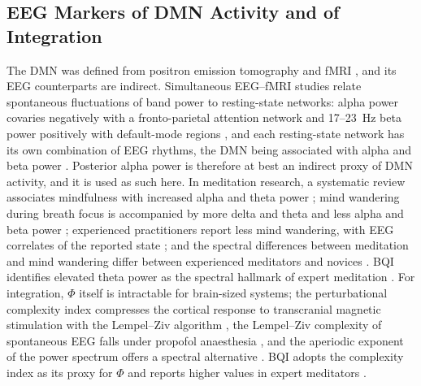 \subsection{EEG Markers of DMN Activity and of Integration}
The DMN was defined from positron emission tomography and fMRI \cite{Raichle2001}, and its EEG counterparts are indirect. Simultaneous EEG--fMRI studies relate spontaneous fluctuations of band power to resting-state networks: alpha power covaries negatively with a fronto-parietal attention network and 17--23~Hz beta power positively with default-mode regions \cite{Laufs2003}, and each resting-state network has its own combination of EEG rhythms, the DMN being associated with alpha and beta power \cite{Mantini2007}. Posterior alpha power is therefore at best an indirect proxy of DMN activity, and it is used as such here. In meditation research, a systematic review associates mindfulness with increased alpha and theta power \cite{Lomas2015}; mind wandering during breath focus is accompanied by more delta and theta and less alpha and beta power \cite{Braboszcz2011}; experienced practitioners report less mind wandering, with EEG correlates of the reported state \cite{Brandmeyer2018}; and the spectral differences between meditation and mind wandering differ between experienced meditators and novices \cite{RodriguezLarios2021}. BQI identifies elevated theta power as the spectral hallmark of expert meditation \cite[App.~B.2]{BQI}. For integration, $\Phi$ itself is intractable for brain-sized systems; the perturbational complexity index compresses the cortical response to transcranial magnetic stimulation with the Lempel--Ziv algorithm \cite{Casali2013}, the Lempel--Ziv complexity of spontaneous EEG falls under propofol anaesthesia \cite{Schartner2015}, and the aperiodic exponent of the power spectrum offers a spectral alternative \cite{Donoghue2020}. BQI adopts the complexity index as its proxy for $\Phi$ and reports higher values in expert meditators \cite[Sec.~6.3]{BQI}.


